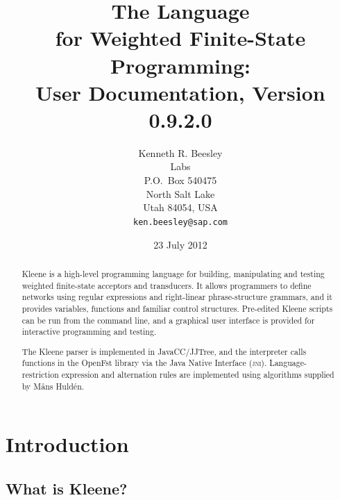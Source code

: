 \documentclass[letterpaper,12pt]{article}
\title{The \Kleene{} Language\\
for Weighted Finite-State Programming:\\
{\Large User Documentation, Version 0.9.2.0}}
\author{Kenneth R. Beesley\\
\acro{sap} Labs\\
P.O.~Box 540475\\
North Salt Lake\\
Utah 84054, USA\\
\texttt{ken.beesley@sap.com}}
\date{23 July 2012}
\newcommand{\Kleene}{Kleene\xspace}
\newcommand{\acro}{\textsc}
\begin{document}

\VerbatimFootnotes

\maketitle





\begin{abstract}
\Kleene{} is a high-level programming language for building,
manipulating and testing weighted 
finite-state acceptors and transducers.
It allows programmers to define networks using regular expressions and
right-linear phrase-structure grammars, and it provides variables, functions and familiar
control structures.  Pre-edited \Kleene{}
scripts can be run from the command line, and a graphical user
interface is provided for interactive programming and testing.

The \Kleene{} parser is implemented in JavaCC/JJTree, and the
interpreter calls functions in the OpenFst library via the Java
Native Interface (\acro{jni}).
Language-restriction expression and alternation rules are implemented using
algorithms supplied by M\r{a}ns Huld\'en. 
\end{abstract}


\newpage
\tableofcontents

\cleardoublepage

\section{Introduction}

\subsection{What is Kleene?}
\end{document}
